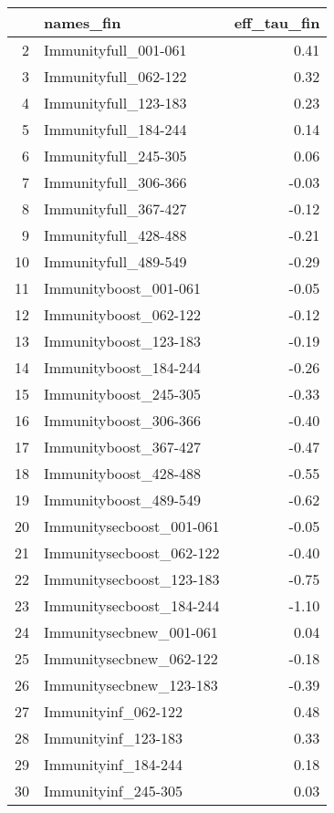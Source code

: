 \begin{table}[ht]
\centering
\begin{tabular}{rlr}
  \hline
 & names\_fin & eff\_tau\_fin \\ 
  \hline
2 & Immunityfull\_001-061 & 0.41 \\ 
  3 & Immunityfull\_062-122 & 0.32 \\ 
  4 & Immunityfull\_123-183 & 0.23 \\ 
  5 & Immunityfull\_184-244 & 0.14 \\ 
  6 & Immunityfull\_245-305 & 0.06 \\ 
  7 & Immunityfull\_306-366 & -0.03 \\ 
  8 & Immunityfull\_367-427 & -0.12 \\ 
  9 & Immunityfull\_428-488 & -0.21 \\ 
  10 & Immunityfull\_489-549 & -0.29 \\ 
  11 & Immunityboost\_001-061 & -0.05 \\ 
  12 & Immunityboost\_062-122 & -0.12 \\ 
  13 & Immunityboost\_123-183 & -0.19 \\ 
  14 & Immunityboost\_184-244 & -0.26 \\ 
  15 & Immunityboost\_245-305 & -0.33 \\ 
  16 & Immunityboost\_306-366 & -0.40 \\ 
  17 & Immunityboost\_367-427 & -0.47 \\ 
  18 & Immunityboost\_428-488 & -0.55 \\ 
  19 & Immunityboost\_489-549 & -0.62 \\ 
  20 & Immunitysecboost\_001-061 & -0.05 \\ 
  21 & Immunitysecboost\_062-122 & -0.40 \\ 
  22 & Immunitysecboost\_123-183 & -0.75 \\ 
  23 & Immunitysecboost\_184-244 & -1.10 \\ 
  24 & Immunitysecbnew\_001-061 & 0.04 \\ 
  25 & Immunitysecbnew\_062-122 & -0.18 \\ 
  26 & Immunitysecbnew\_123-183 & -0.39 \\ 
  27 & Immunityinf\_062-122 & 0.48 \\ 
  28 & Immunityinf\_123-183 & 0.33 \\ 
  29 & Immunityinf\_184-244 & 0.18 \\ 
  30 & Immunityinf\_245-305 & 0.03 \\ 

\end{tabular}
\end{table}
